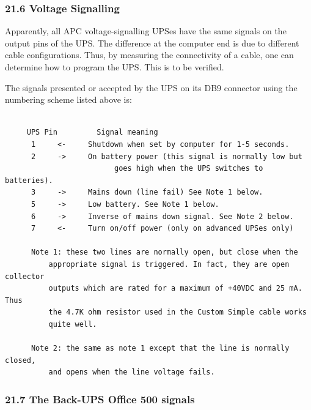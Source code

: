 \label{Voltage-Signalling}

\subsubsection*{21.6 Voltage Signalling}

\label{index-Voltage-Signalling_002c-Cables-198}
\label{index-Cables_002c-Voltage-Signalling-199}
Apparently, all APC voltage-signalling UPSes have the same signals on the
output pins of the UPS. The difference at the computer end is due to different
cable configurations. Thus, by measuring the connectivity of a cable, one can
determine how to program the UPS. This is to be verified.  

The signals presented or accepted by the UPS on its DB9 connector using the
numbering scheme listed above is: 

\footnotesize
\begin{verbatim}
     
     UPS Pin         Signal meaning
      1     <-     Shutdown when set by computer for 1-5 seconds.
      2     ->     On battery power (this signal is normally low but
                         goes high when the UPS switches to batteries).
      3     ->     Mains down (line fail) See Note 1 below.
      5     ->     Low battery. See Note 1 below.
      6     ->     Inverse of mains down signal. See Note 2 below.
      7     <-     Turn on/off power (only on advanced UPSes only)
     
      Note 1: these two lines are normally open, but close when the
          appropriate signal is triggered. In fact, they are open collector
          outputs which are rated for a maximum of +40VDC and 25 mA. Thus
          the 4.7K ohm resistor used in the Custom Simple cable works
          quite well.
     
      Note 2: the same as note 1 except that the line is normally closed,
          and opens when the line voltage fails.
\end{verbatim}
\normalsize

\label{The-Back_002dUPS-Office-500-signals}

\subsubsection*{21.7 The Back-UPS Office 500 signals}

